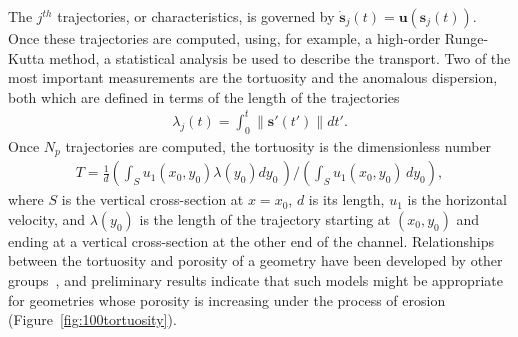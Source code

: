 \documentclass[11pt]{article}
\newcommand{\bvec}[1]{{\mathbf{#1}}}
\newcommand{\uu}{\bvec{u}}
\renewcommand{\ss}{{\mathbf{s}}}
\begin{document}
The $j^{th}$ trajectories, or characteristics, is governed by
$\dot{\ss}_j(t) = \uu(\ss_j(t))$. Once these trajectories are computed,
using, for example, a high-order Runge-Kutta method, a statistical
analysis be used to describe the transport. Two of the most important
measurements are the tortuosity and the anomalous dispersion, both which
are defined in terms of the length of the trajectories
\begin{align}
  \lambda_j(t) = \int_{0}^{t} \|\ss'(t')\| dt'.
\end{align}
Once $N_p$ trajectories are computed, the tortuosity is the
dimensionless number
\begin{align}
  T = \frac{1}{d} \left(\int_{S} u_1(x_0,y_0)\lambda(y_0) dy_0\, \right)
  \Bigg/ \left(\int_S u_1(x_0,y_0)\, dy_0 \right),
\end{align}
where $S$ is the vertical cross-section at $x=x_0$, $d$ is its length,
$u_1$ is the horizontal velocity, and $\lambda(y_0)$ is the length of
the trajectory starting at $(x_0,y_0)$ and ending at a vertical
cross-section at the other end of the channel. Relationships between the
tortuosity and porosity of a geometry have been developed by other
groups~\cite{kop-kat-tim1996, dud-koz-mat2011, mat-kha-koz2008}, and
preliminary results indicate that such models might be appropriate for
geometries whose porosity is increasing under the process of erosion
(Figure~\ref{fig:100tortuosity}).
\end{document}
